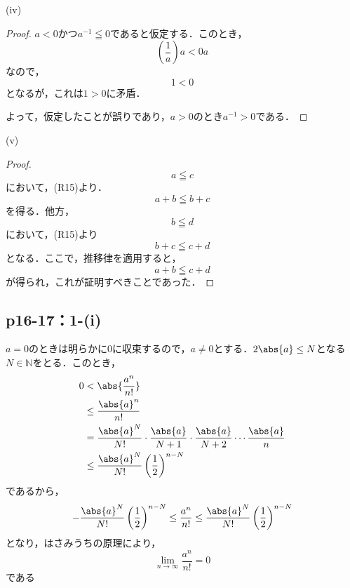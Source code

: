 \documentclass[a4paper,10pt,fleqn]{ltjsarticle}
\begin{document}
    \begin{itembox}[c]{(iv)}
        \begin{proof}
            $a<0$かつ$a^{-1} \leqq 0$であると仮定する．このとき，
            \[
               \left ( \frac{1}{a} \right) a < 0a
            \]
            なので，
            \[
                1<0
            \]
            となるが，これは$1>0$に矛盾．

            よって，仮定したことが誤りであり，$a>0$のとき$a^{-1} >0$である．
            \end{proof}
        \end{itembox}

        \begin{itembox}[c]{(v)}
            \begin{proof}
                \[
                    a \leqq c
                \]
                において，(R15)より．
                \[
                    a+b \leqq b+c
                \]
                を得る．他方，
                \[
                    b \leqq d
                \]
                において，(R15)より
                \[
                    b + c \leqq c+d
                \]
                となる．ここで，推移律を適用すると，
                \[
                    a+b \leqq c+d
                \]
                が得られ，これが証明すべきことであった．
            \end{proof}
            \end{itembox}
%
\subsection*{p16-17：1-(i)}

\begin{tleftbar}
    $a=0$のときは明らかに$0$に収束するので，$a \ne 0$とする．$2\abs{a} \le N$となる$N \in \mathbb{N}$をとる．このとき，
    \begin{align*}
         0 &< \abs{ \frac{a^n}{n!} } \\
         &\le \frac{\abs{a}^n}{n!} \\
         &= \frac{\abs{a}^{N}}{N!} \cdot \frac{\abs{a}}{N+1} \cdot \frac{\abs{a}}{N+2} \dotsm \frac{\abs{a}}{n} \\
         & \le  \frac{\abs{a}^{N}}{N!} \left(\frac{1}{2} \right)^{n-N}
    \end{align*}
    であるから，
    \[
        - \frac{\abs{a}^{N}}{N!} \left(\frac{1}{2} \right)^{n-N} \le  \frac{a^n}{n!} \le \frac{\abs{a}^{N}}{N!} \left(\frac{1}{2} \right)^{n-N}
    \]
    となり，はさみうちの原理により，
    \[
        \lim_{n \to \infty} \frac{a^n}{n!} =0
    \]
    である
\end{tleftbar}
\end{document}
